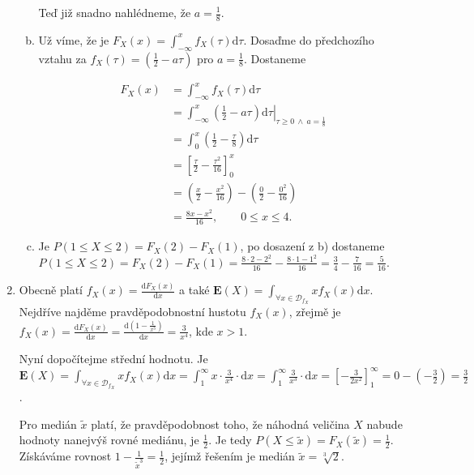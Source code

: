 ﻿\documentclass{article}
\begin{document}
\begin{enumerate}[1)]
\begin{enumerate}[a)]
Teď již snadno nahlédneme, že $a = \frac{1}{8}$.

\item Už víme, že je $F_{X}(x) = \int_{-\infty}^{x} f_{X}(\tau) \text{d}\tau$. Dosaďme do předchozího vztahu za $f_{X}(\tau) = \left(\frac{1}{2} - a\tau \right)$ pro $a = \frac{1}{8}$. Dostaneme

\begin{equation*}
\begin{split}
  F_{X}(x) &= \int_{-\infty}^{x} f_{X}(\tau) \text{d}\tau \\
  &= \int_{-\infty}^{x} \left. \left(\frac{1}{2} - a\tau \right) \text{d}\tau \right\rvert_{\tau \geq 0 \ \wedge \ a = \frac{1}{8}} \\
  &= \int_{0}^{x} \left(\frac{1}{2} - \frac{\tau}{8} \right) \text{d}\tau \\
  &= \left[ \frac{\tau}{2} - \frac{\tau^{2}}{16} \right]_{0}^{x} \\
  &= \left( \frac{x}{2} - \frac{x^{2}}{16} \right) - \left( \frac{0}{2} - \frac{0^{2}}{16} \right)\\
  &= \frac{8x - x^{2}}{16}, \qquad 0 \leq x \leq 4.
\end{split}
\end{equation*}

\item Je $P(1 \leq X \leq 2) = F_{X}(2) - F_{X}(1)$, po dosazení z b) dostaneme $P(1 \leq X \leq 2) = F_{X}(2) - F_{X}(1) = \frac{8 \cdot 2 - 2^{2}}{16} - \frac{8 \cdot 1 - 1^{2}}{16} = \frac{3}{4} - \frac{7}{16} = \frac{5}{16}$.

\end{enumerate}

\item Obecně platí $f_{X}(x) = \frac{\text{d} F_{X}(x)}{\text{d}x}$ a také $\mathbf{E}(X) = \int_{\forall x \in \mathcal{D}_{f_{X}}} x f_{X}(x) \text{d}x$. Nejdříve najděme pravděpodobnostní hustotu $f_{X}(x)$, zřejmě je $f_{X}(x) = \frac{\text{d} F_{X}(x)}{\text{d}x} = \frac{\text{d} \left(1 - \frac{1}{x^{3}} \right)}{\text{d}x} = \frac{3}{x^{4}}$, kde $x > 1$.

Nyní dopočítejme střední hodnotu. Je $\mathbf{E}(X) = \int_{\forall x \in \mathcal{D}_{f_{X}}} x f_{X}(x) \text{d}x = \int_{1}^{\infty} x \cdot \frac{3}{x^{4}} \cdot \text{d}x = \int_{1}^{\infty} \frac{3}{x^{3}} \cdot \text{d}x = \left[ -\frac{3}{2x^2} \right]_{1}^{\infty} = 0 - (- \frac{3}{2}) = \frac{3}{2}$.

Pro medián $\tilde{x}$ platí, že pravděpodobnost toho, že náhodná veličina $X$ nabude hodnoty nanejvýš rovné mediánu, je $\frac{1}{2}$. Je tedy $P(X \leq \tilde{x}) = F_{X}(\tilde{x}) = \frac{1}{2}$. Získáváme rovnost $1 - \frac{1}{\tilde{x}^{3}} = \frac{1}{2}$, jejímž řešením je medián $\tilde{x} = \sqrt[3]{2}$.


\end{enumerate}
\end{document}
